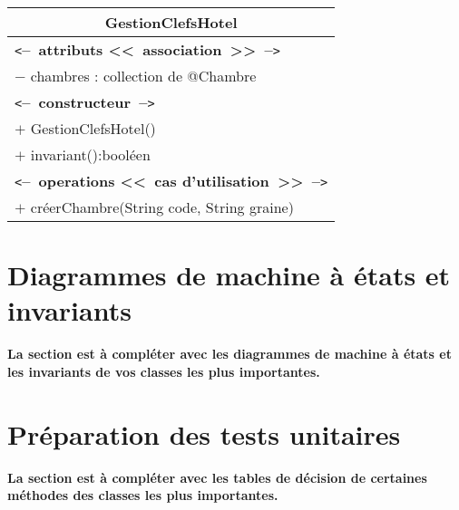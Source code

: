\documentclass[11pt,article]{article}
\newcommand{\cmt}[1]{\texttt{<}\textbf{--~#1~--}\texttt{>}}
\begin{document}
\begin{center}
\begin{longtable}{|p{15cm}|}
\hline
\multicolumn{1}{|c|}{{\Large \textsf{GestionClefsHotel}}} \\
\hline
\cmt{attributs <<~association~>>}\\
$-$ chambres : collection de @Chambre \\
\hline
\cmt{constructeur} \\
$+$ GestionClefsHotel()\\
$+$ invariant():booléen\\
\cmt{operations <<~cas d'utilisation~>>} \\
$+$ créerChambre(String code, String graine) \\
\hline
\end{longtable}%
\end{center}

\newpage

\section{Diagrammes de machine à états et invariants}

{\color{red}\textbf{La section est à compléter avec les diagrammes de
    machine à états et les invariants de vos classes les plus
    importantes.}}

\newpage

\section{Préparation des tests unitaires}

{\color{red}\textbf{La section est à compléter avec les tables de
    décision de certaines méthodes des classes les plus importantes.}}
\end{document}
